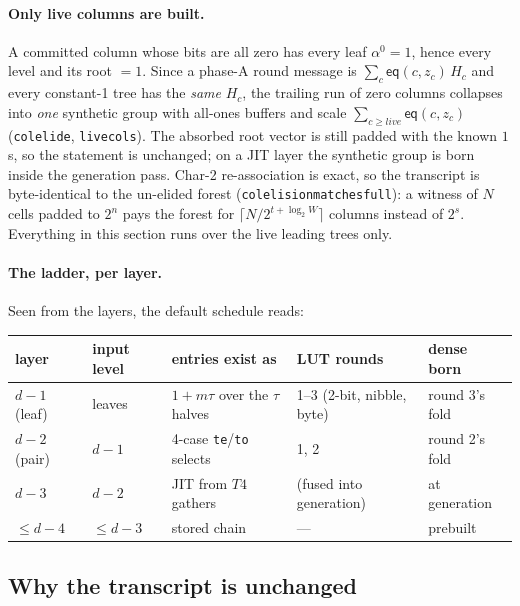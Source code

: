 \documentclass[11pt]{article}
\newcommand{\eq}{\mathsf{eq}}
\newcommand{\code}[1]{{\def\_{\textunderscore\allowbreak}\texttt{#1}}}
\theoremstyle{definition}
\begin{document}
\paragraph{Only live columns are built.}
A committed column whose bits are all zero has every leaf
$\alpha^0 = 1$, hence every level and its root $= 1$.  Since a phase-A
round message is $\sum_c \eq(c, z_c)\,H_c$ and every constant-1 tree
has the \emph{same} $H_c$, the trailing run of zero columns collapses
into \emph{one} synthetic group with all-ones buffers and scale
$\sum_{c \ge \mathit{live}} \eq(c, z_c)$ (\code{col\_elide},
\code{live\_cols}).  The absorbed root vector is still padded with the
known $1$s, so the statement is unchanged; on a JIT layer the
synthetic group is born inside the generation pass.  Char-2
re-association is exact, so the transcript is byte-identical to the
un-elided forest (\code{col\_elision\_matches\_full}): a witness of
$N$ cells padded to $2^n$ pays the forest for
$\lceil N / 2^{t + \log_2 W} \rceil$ columns instead of $2^s$.
Everything in this section runs over the live leading trees only.

\paragraph{The ladder, per layer.}
Seen from the layers, the default schedule reads:

\begin{center}
\small
\begin{tabular}{lllll}
\toprule
layer & input level & entries exist as & LUT rounds & dense born \\
\midrule
$d{-}1$ (leaf) & leaves & $1 + m\tau$ over the $\tau$ halves &
  1--3 (2-bit, nibble, byte) & round 3's fold \\
$d{-}2$ (pair) & $d{-}1$ & 4-case \code{te}/\code{to} selects &
  1, 2 & round 2's fold \\
$d{-}3$ & $d{-}2$ & JIT from $T4$ gathers & (fused into generation) &
  at generation \\
$\le d{-}4$ & $\le d{-}3$ & stored chain & --- & prebuilt \\
\bottomrule
\end{tabular}
\end{center}

\subsection{Why the transcript is unchanged}
\label{sec:identity}
\end{document}
